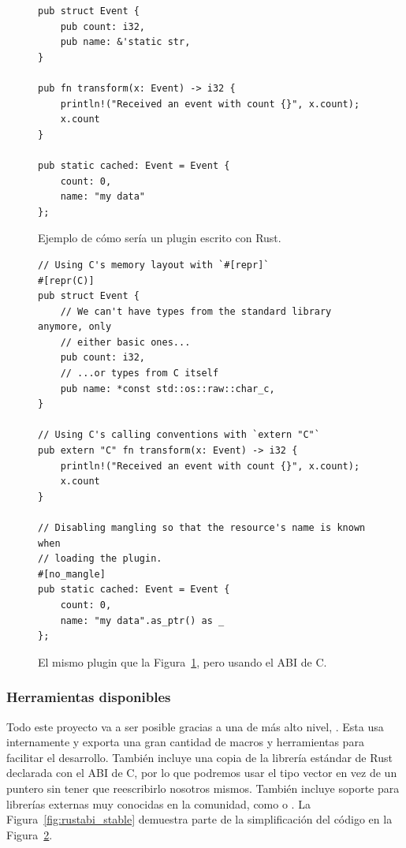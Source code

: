 \begin{figure}
    \centering
    \begin{verbatim}
pub struct Event {
    pub count: i32,
    pub name: &'static str,
}

pub fn transform(x: Event) -> i32 {
    println!("Received an event with count {}", x.count);
    x.count
}

pub static cached: Event = Event {
    count: 0,
    name: "my data"
};
    \end{verbatim}

    \caption{Ejemplo de cómo sería un plugin escrito con Rust.}%
    \label{fig:rustpure}
\end{figure}

\begin{figure}
    \centering
    \begin{verbatim}
// Using C's memory layout with `#[repr]`
#[repr(C)]
pub struct Event {
    // We can't have types from the standard library anymore, only
    // either basic ones...
    pub count: i32,
    // ...or types from C itself
    pub name: *const std::os::raw::char_c,
}

// Using C's calling conventions with `extern "C"`
pub extern "C" fn transform(x: Event) -> i32 {
    println!("Received an event with count {}", x.count);
    x.count
}

// Disabling mangling so that the resource's name is known when
// loading the plugin.
#[no_mangle]
pub static cached: Event = Event {
    count: 0,
    name: "my data".as_ptr() as _
};
    \end{verbatim}

    \caption{El mismo plugin que la Figura~\ref{fig:rustpure}, pero usando el
    ABI de C.}%
    \label{fig:rustffi}
\end{figure}

\subsubsection{Herramientas disponibles}

Todo este proyecto va a ser posible gracias a una \crate de más alto nivel,
. Esta usa  internamente y exporta una
gran cantidad de macros y herramientas para facilitar el desarrollo. También
incluye una copia de la librería estándar de Rust declarada con el ABI de C, por
lo que podremos usar el tipo vector  en vez de un puntero
 sin tener que reescribirlo nosotros mismos. También incluye
soporte para librerías externas muy conocidas en la comunidad, como
 o . La
Figura~\ref{fig:rustabi_stable} demuestra parte de la simplificación del código
en la Figura~\ref{fig:rustffi}.

